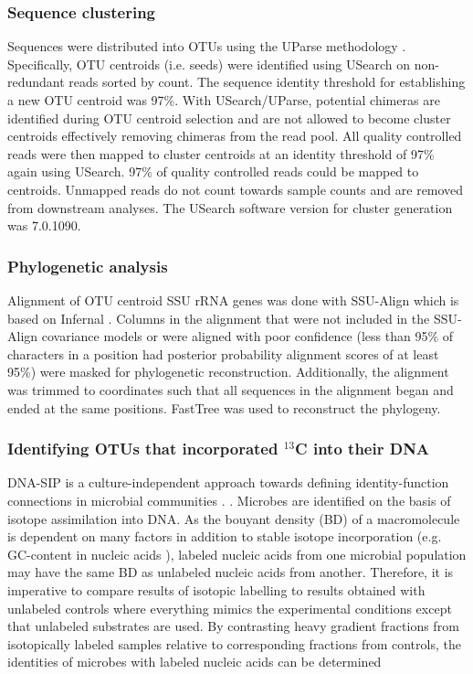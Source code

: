 \subsubsection{Sequence clustering}
Sequences were distributed into OTUs using the UParse methodology
\citep{Edgar_2013}. Specifically, OTU centroids (i.e. seeds) were identified
using USearch on non-redundant reads sorted by count. The sequence
identity threshold for establishing a new OTU centroid was 97\%. 
With USearch/UParse,
potential chimeras are identified during OTU centroid selection and are not
allowed to become cluster centroids effectively removing chimeras from the read
pool. All quality controlled reads were then mapped to cluster centroids at an
identity threshold of 97\% again using USearch. 97\% of quality
controlled reads could be mapped to centroids. Unmapped reads do not count
towards sample counts and are removed from downstream analyses. The
USearch software version for cluster generation was 7.0.1090.

\subsubsection{Phylogenetic analysis}
Alignment of OTU centroid SSU rRNA genes was done with SSU-Align which is based on Infernal
\citep{Nawrocki_2013, Nawrocki_2009}. Columns in the alignment that were not included in
the SSU-Align covariance models or were aligned with poor confidence (less than
95\% of characters in a position had posterior probability alignment scores of
at least 95\%) were masked for phylogenetic reconstruction. Additionally, the
alignment was trimmed to coordinates such that all sequences in the alignment
began and ended at the same positions. FastTree \cite{Price_2009} was used to
reconstruct the phylogeny.

\subsubsection{Identifying OTUs that incorporated $^{13}$C into their DNA}
DNA-SIP is a culture-independent approach towards defining identity-function
connections in microbial communities \cite{Buckley_2011, Neufeld_2007, Radajewski_2003}. . Microbes are identified on the basis of
isotope assimilation into DNA. As the bouyant density (BD) of a macromolecule is dependent on many factors in addition to stable isotope incorporation (e.g. GC-content in nucleic acids \cite{Youngblut_2014}),
labeled nucleic acids from one microbial population may have the same BD as unlabeled nucleic acids from another. Therefore, it is imperative to compare results of isotopic labelling to results obtained with unlabeled controls where everything mimics the experimental conditions except that unlabeled substrates are used. By contrasting heavy gradient fractions from isotopically labeled samples relative to corresponding fractions from controls, the identities of microbes with labeled nucleic acids can be
determined 

